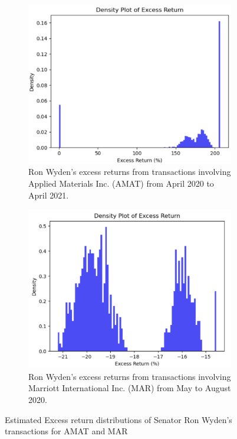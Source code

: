 \documentclass[15pt,letterpaper]{article}
\begin{document}
\begin{figure}[htbp]
  \centering
  \begin{subfigure}[t]{0.45\textwidth}
  \centering
  \includegraphics[width=\textwidth]{imgs/RWAMAT.png}
  \caption{Ron Wyden's excess returns from transactions involving Applied Materials Inc. (AMAT) from April 2020 to April 2021.}
  \label{fig:er_klac}
  \end{subfigure}
  \hfill
  \begin{subfigure}[t]{0.45\textwidth}
  \centering
  \includegraphics[width=\textwidth]{imgs/RWMAR.png}
  \caption{Ron Wyden's excess returns from transactions involving Marriott International Inc. (MAR) from May to August 2020.}
  \label{fig:er_mar}
  \end{subfigure}
  \caption{Estimated Excess return distributions of Senator Ron Wyden's transactions for AMAT and MAR
  }
  \label{fig:er}
  \end{figure}
\end{document}
